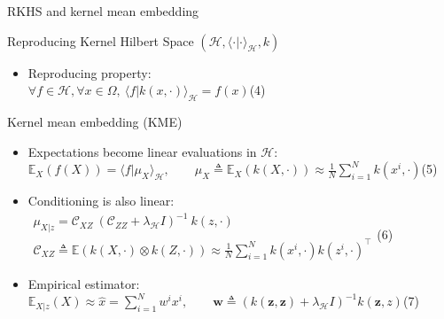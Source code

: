 \documentclass[9pt]{beamer}
\begin{document}
\begin{frame}{RKHS and kernel mean embedding}

\begin{block}{Reproducing Kernel Hilbert Space $(\mathcal{H},\langle\cdot|\cdot\rangle_{\mathcal{H}},k)$}
    \begin{itemize}
    \item Reproducing property:\\
    \hfill$\displaystyle\forall f\in\mathcal{H},\forall x\in\Omega,\:\langle f|k(x,\cdot)\rangle_{\mathcal{H}}=f(x)$\hfill(4)
    \end{itemize}
\end{block}

\begin{block}{Kernel mean embedding (KME)}
    \begin{itemize}
    \item Expectations become linear evaluations in $\mathcal{H}$:\\
    \hfill$\displaystyle\mathbb{E}_X(f(X))=\langle f|\mu_X\rangle_{\mathcal{H}},\qquad\mu_X\triangleq\mathbb{E}_X(k(X,\cdot))\approx\frac{1}{N}\sum_{i=1}^Nk(x^i,\cdot)$\hfill(5)
    \item Conditioning is also linear:\\
    \hfill$\begin{gathered}
    \mu_{X|z}=\mathcal{C}_{XZ}\:(\mathcal{C}_{ZZ}+\lambda_{\mathcal{H}}I)^{-1}\:k(z,\cdot)\\
    \mathcal{C}_{XZ}\triangleq\mathbb{E}(k(X,\cdot)\otimes k(Z,\cdot))\approx\frac{1}{N}\sum_{i=1}^Nk(x^i,\cdot)k(z^i,\cdot)^\top
    \end{gathered}$\hfill(6)
    \item Empirical estimator:\\
    \hfill$\displaystyle\mathbb{E}_{X|z}(X)\approx\hat{x}=\sum_{i=1}^{N}w^ix^i,\qquad\mathbf{w}\triangleq(k(\mathbf{z},\mathbf{z})+\lambda_{\mathcal{H}}I)^{-1}k(\mathbf{z},z)$\hfill(7)
    \end{itemize}
\end{block}

\end{frame}
\end{document}
